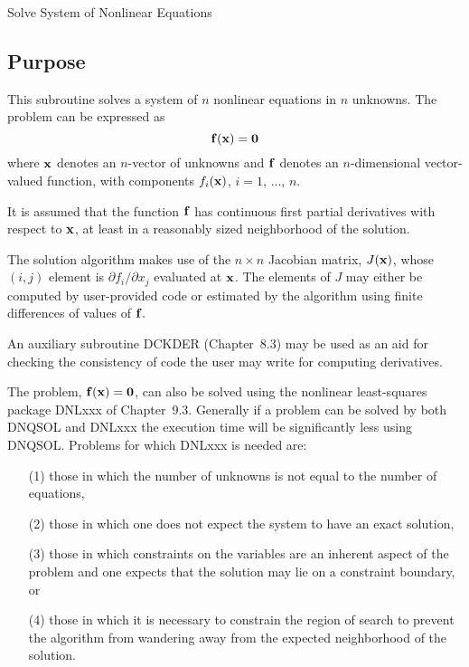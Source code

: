 \documentclass[twoside]{MATH77}
\begin{document}
 Solve System of Nonlinear Equations


\subsection{Purpose}

This subroutine solves a system of $n$ nonlinear equations in $n$ unknowns.
The problem can be expressed as
\begin{equation*}
{\bf f}({\bf x}) = {\bf 0}
\end{equation*}
where ${\bf x}$ denotes an $n$-vector of unknowns and ${\bf f}$ denotes an $%
n $-dimensional vector-valued function, with components $f_i({\bf x})$, $i =
1$, ..., $n.$

It is assumed that the function ${\bf f}$ has continuous first partial
derivatives with respect to ${\bf x}$, at least in a reasonably sized
neighborhood of the solution.

The solution algorithm makes use of the $n\times n$ Jacobian matrix, $J({\bf %
x})$, whose $(i,j)$ element is $\partial f_i/\partial x_j$ evaluated at $%
{\bf x}$. The elements of $J$ may either be computed by user-provided code
or estimated by the algorithm using finite differences of values of ${\bf f}%
. $

An auxiliary subroutine DCKDER (Chapter~8.3) may be used as an aid for
checking the consistency of code the user may write for computing
derivatives.

The problem, ${\bf f}({\bf x}) = {\bf 0}$, can also be solved using the
nonlinear least-squares package DNLxxx of Chapter~9.3. Generally if a
problem can be solved by both DNQSOL and DNLxxx the execution time will be
significantly less using DNQSOL. Problems for which DNLxxx is needed are:
\begin{itemize}
\item[(1)] those in which the number of unknowns is not equal to the number of
equations,
\item[(2)] those in which one does not expect the system to have an
exact solution,
\item[(3)] those in which constraints on the variables are an
inherent aspect of the problem and one expects that the solution may lie on
a constraint boundary, or
\item[(4)] those in which it is necessary to constrain
the region of search to prevent the algorithm from wandering away from the
expected neighborhood of the solution.
\end{itemize}
\end{document}
